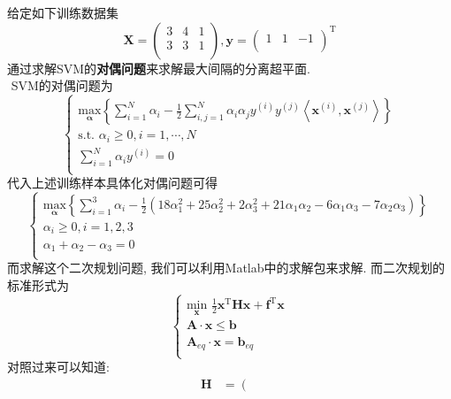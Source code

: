 \documentclass{article}
\begin{document}
\begin{homeworkProblem}
	给定如下训练数据集$$\boldsymbol{X}=\left( \begin{matrix}
		3&		4&		1\\
		3&		3&		1\\
	\end{matrix} \right) ,\boldsymbol{y}=\left( \begin{matrix}
		1&		1&		-1\\
	\end{matrix} \right) ^{\text{T}}$$
	通过求解SVM的\textbf{对偶问题}来求解最大间隔的分离超平面.
	\\

	\solution \,\,SVM的对偶问题为
	$$
	\begin{cases}
		\displaystyle \underset{\boldsymbol{\alpha }}{\text{max}}\left\{ \sum_{i=1}^N{\alpha _i}-\frac{1}{2}\sum_{i,j=1}^N{\alpha _i\alpha _jy^{\left( i \right)}y^{\left( j \right)}\left< \boldsymbol{x}^{\left( i \right)},\boldsymbol{x}^{\left( j \right)} \right>} \right\}\\
		\text{s.t.}\,\, \alpha _i\ge 0,i=1,\cdots ,N\\
		\displaystyle \sum_{i=1}^N{\alpha _iy^{\left( i \right)}}=0\\
	\end{cases}
	$$
	代入上述训练样本具体化对偶问题可得
	$$
	\begin{cases}
		\displaystyle \underset{\boldsymbol{\alpha }}{\text{max}}\left\{ \sum_{i=1}^3{\alpha _i}-\frac{1}{2}\left( 18\alpha _{1}^{2}+25\alpha _{2}^{2}+2\alpha _{3}^{2}+21\alpha _1\alpha _2-6\alpha _1\alpha _3-7\alpha _2\alpha _3 \right) \right\}\\
		\alpha _i\ge 0,i=1,2,3\\
		\alpha _1+\alpha _2-\alpha _3=0\\
	\end{cases}
	$$
	而求解这个二次规划问题, 我们可以利用Matlab中的求解包来求解. 而二次规划的标准形式为
	$$
	\begin{cases}
		\displaystyle \underset{\boldsymbol{x}}{\text{min}}\,\,\frac{1}{2}\boldsymbol{x}^{\text{T}}\boldsymbol{Hx}+\boldsymbol{f}^{\text{T}}\boldsymbol{x}\\
		\boldsymbol{A}\cdot \boldsymbol{x}\le \boldsymbol{b}\\
		\boldsymbol{A}_{eq}\cdot \boldsymbol{x}=\boldsymbol{b}_{eq}\\
	\end{cases}
	$$
	对照过来可以知道:
	\begin{align}
		\boldsymbol{H}&=\left( \begin{matrix}

\end{matrix}
\end{align}
\end{homeworkProblem}
\end{document}
